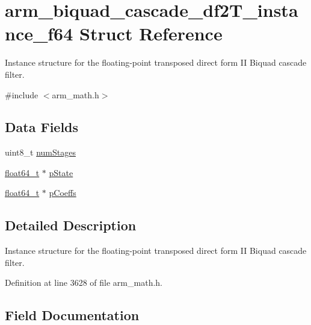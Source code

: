 \hypertarget{structarm__biquad__cascade__df2_t__instance__f64}{}\section{arm\+\_\+biquad\+\_\+cascade\+\_\+df2\+T\+\_\+instance\+\_\+f64 Struct Reference}
\label{structarm__biquad__cascade__df2_t__instance__f64}


Instance structure for the floating-\/point transposed direct form II Biquad cascade filter.  




{\ttfamily \#include $<$arm\+\_\+math.\+h$>$}

\subsection*{Data Fields}
\begin{DoxyCompactItemize}
\item 
uint8\+\_\+t \hyperlink{structarm__biquad__cascade__df2_t__instance__f64_a3615af038f56917909e0370c11bc2ec7}{num\+Stages}
\item 
\hyperlink{arm__math_8h_ac55f3ae81b5bc9053760baacf57e47f4}{float64\+\_\+t} $\ast$ \hyperlink{structarm__biquad__cascade__df2_t__instance__f64_ae97c926a7e3a4bfe26fcdd0a3cc2f5c6}{p\+State}
\item 
\hyperlink{arm__math_8h_ac55f3ae81b5bc9053760baacf57e47f4}{float64\+\_\+t} $\ast$ \hyperlink{structarm__biquad__cascade__df2_t__instance__f64_a2f5f42f60a50d7cb39837fd9b80cd8f0}{p\+Coeffs}
\end{DoxyCompactItemize}


\subsection{Detailed Description}
Instance structure for the floating-\/point transposed direct form II Biquad cascade filter. 

Definition at line 3628 of file arm\+\_\+math.\+h.



\subsection{Field Documentation}
